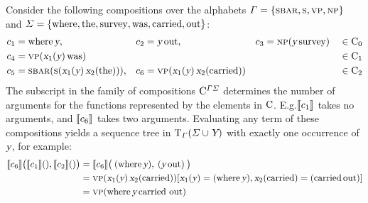 \documentclass[../../document.tex]{subfiles}
\begin{document}
    \begin{example}\label{ex:dcp:comp}
        Consider the following  compositions over the alphabets \(\varGamma = \{ \textsc{sbar}, \textsc{s}, \textsc{vp}, \textsc{np} \}\) and \(\varSigma = \{\text{where}, \text{the}, \text{survey}, \text{was}, \text{carried}, \text{out}\}\):
        \begin{align*}
            c_1 &= \text{where} \, \textsl{y},
            &c_2 &= \textsl{y} \, \text{out},
            &c_3 &= \textsc{np} (\textsl{y} \, \text{survey}) && \in \mathrm{C}_0\\
            c_4 &= \textsc{vp}(\textsl{x}_1(\textsl{y}) \, \text{was}) && && && \in \mathrm{C}_1 \\
            c_5 &= \textsc{sbar} (\textsc{s} (\textsl{x}_1(\textsl{y}) \, \textsl{x}_2(\text{the}))),
            &c_6 &= \textsc{vp}(\textsl{x}_1(\textsl{y}) \, \textsl{x}_2(\text{carried})) && && \in \mathrm{C}_2
        \end{align*}
        The subscript in the family of  compositions \(\mathrm{C}^{\varGamma\varSigma}\) determines the number of arguments for the functions represented by the elements in \(\mathrm{C}\).
        E.g.\@ \(\llbracket c_1\rrbracket\) takes no arguments, and \(\llbracket c_6\rrbracket\) takes two arguments.
        Evaluating any term of these compositions yields a sequence tree in \(\operatorname{T}_\varGamma(\varSigma \cup \textsl{Y})\) with exactly one occurrence of \(\textsl{y}\), for example:
        \begin{align*}
            \llbracket c_6\rrbracket \big( \llbracket c_1\rrbracket(), \llbracket c_2\rrbracket() \big)
            &= \llbracket c_6\rrbracket \big( \: (\text{where} \, \textsl{y}), \: (\textsl{y} \, \text{out}) \: \big) \\
            &= \textsc{vp}(\textsl{x}_1(\textsl{y}) \, \textsl{x}_2(\text{carried}))[\textsl{x}_1(\textsl{y})=(\text{where} \, \textsl{y}), \textsl{x}_2(\text{carried})=(\text{carried}\, \text{out})] \\
            &= \textsc{vp}(\text{where} \, \textsl{y} \, \text{carried out})
        \end{align*}
    \end{example}
\end{document}
